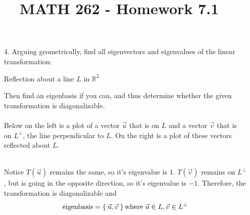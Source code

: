 \documentclass[letterpaper,12pt]{article}
\author{}
\title{MATH 262 - Homework 7.1}
\date{} %
\begin{document}
\maketitle

\begin{enumerate}
  \item[4.]
    Arguing geometrically, find all eigenvectors and eigenvalues of the linear transformation:
    \begin{center}
      Reflection about a line $L$ in $\mathbb{R}^2$
    \end{center}
    Then find an eigenbasis if you can, and thus determine whether the given transformation is diagonalizable. \\ \\
    Below on the left is a plot of a vector $\vec{u}$ that is on $L$ and a vector $\vec{v}$ that is on $L^\perp$, the line perpendicular to $L$. On the right is a plot of these vectors reflected about $L$. \\
    \qquad
     \\
    Notice $T(\vec{u})$ remains the same, so it's eigenvalue is 1. $T(\vec{v})$ remains on $L^\perp$, but is going in the opposite direction, so it's eigenvalue is $-1$. Therefore, the transformation is diagonalizable and
    \begin{align*}
      \text{eigenbasis} = \Set{\vec{u}, \vec{v}} \text{where} \ \vec{u} \in L, \vec{v} \in L^\perp
    \end{align*}
\end{enumerate}
\end{document}
